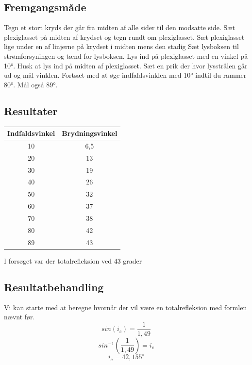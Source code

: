 \subsection{Fremgangsmåde}
Tegn et stort kryds der går fra midten af alle sider til den modsatte side. Sæt plexiglasset på midten af krydset og tegn rundt om plexiglasset. Sæt plexiglasset lige under en af linjerne på krydset i midten mens den stadig Sæt lysboksen til strømforsyningen og tænd for lysboksen. Lys ind på plexiglasset med en vinkel på 10°.  Husk at lys ind på midten af plexiglasset. Sæt en prik der hvor lysstrålen går ud og mål vinklen. Fortsæt med at øge indfaldsvinklen med 10° indtil du rammer 80°. Mål også 89°.

\subsection{Resultater}
\begin{table}[h]
    \centering
    \begin{tabular}{|c|c|}
        \hline
        Indfaldsvinkel & Brydningsvinkel\\
        \hline
        10 & 6,5\\
        \hline
        20 & 13\\
        \hline
        30 & 19\\
        \hline
        40 & 26\\
        \hline
        50 & 32\\
        \hline
        60 & 37\\
        \hline
        70 & 38\\
        \hline
        80 & 42\\
        \hline
        89 & 43\\
        \hline
    \end{tabular}
\end{table}

I forsøget var der totalrefleksion ved 43 grader

\subsection{Resultatbehandling}
Vi kan starte med at beregne hvornår der vil være en totalrefleksion med formlen nævnt før.
\begin{equation*}
    sin(i_{c}) = \frac{1}{1,49}
\end{equation*}
\begin{equation*}
    sin^{-1}(\frac{1}{1,49}) = i_{c}
\end{equation*}
\begin{equation*}
    i_{c} = 42,155^{\circ}
\end{equation*}

